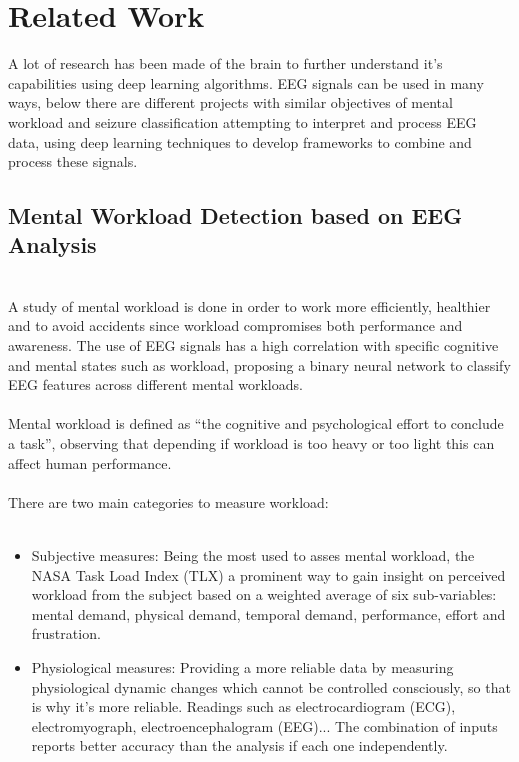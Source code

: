 \section{Related Work}
\label{sec-related-work}
A lot of research has been made of the brain to further understand it’s capabilities using deep learning algorithms. EEG signals can be used in many ways, below there are different projects with similar objectives of mental workload and seizure classification attempting to interpret and process EEG data, using deep learning techniques to develop frameworks to combine and process these signals.
\\
\subsection{Mental Workload Detection based on EEG Analysis}
\leavevmode\\
A study of mental workload\cite{wrokload} is done in order to work more efficiently, healthier and to avoid accidents since workload compromises both performance and awareness. The use of EEG signals has a high correlation with specific cognitive and mental states such as workload, proposing a binary neural network to classify EEG features across different mental workloads.
\\\\
Mental workload is defined as “the cognitive and psychological effort to conclude a task”, observing that depending if workload is too heavy or too light this can affect human performance. 
\\\\
There are two main categories to measure workload:
\\\\
\begin{itemize}
\item Subjective measures: Being the most used to asses mental workload, the NASA Task Load Index (TLX) a prominent way to gain insight on perceived workload from the subject based on a weighted average of six sub-variables: mental demand, physical demand, temporal demand, performance, effort and frustration. 
\item Physiological measures: Providing a more reliable data by measuring physiological dynamic changes which cannot be controlled consciously, so that is why it’s more reliable. Readings such as electrocardiogram (ECG), electromyograph, electroencephalogram (EEG)... The combination of inputs reports better accuracy than the analysis if each one independently.
\end{itemize}
